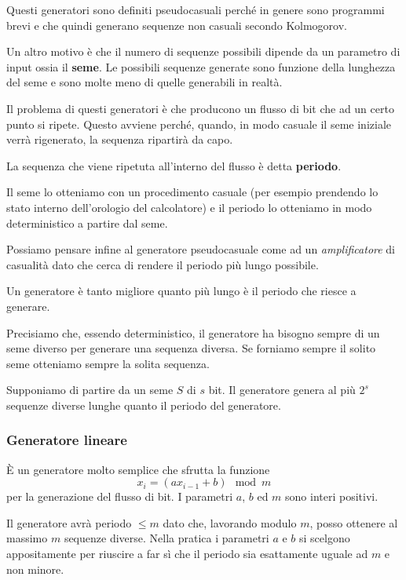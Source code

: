 Questi generatori sono definiti pseudocasuali perch\'e in genere sono programmi brevi e che quindi generano sequenze
non casuali secondo Kolmogorov.

Un altro motivo \`e che il numero di sequenze possibili dipende da un parametro di input ossia il \textbf{seme}. Le
possibili sequenze generate sono funzione della lunghezza del seme e sono molte meno di quelle generabili in realt\`a.

Il problema di questi generatori \`e che producono un flusso di bit che ad un certo punto si ripete. Questo avviene
perch\'e, quando, in modo casuale il seme iniziale verr\`a rigenerato, la sequenza ripartir\`a da capo.

La sequenza che viene ripetuta all'interno del flusso \`e detta \textbf{periodo}.

Il seme lo otteniamo con un procedimento casuale (per esempio prendendo lo stato interno dell'orologio del calcolatore)
e il periodo lo otteniamo in modo deterministico a partire dal seme.

Possiamo pensare infine al generatore pseudocasuale come ad un \emph{amplificatore} di casualit\`a dato che cerca di
rendere il periodo pi\`u lungo possibile.

Un generatore \`e tanto migliore quanto pi\`u lungo \`e il periodo che riesce a generare.

Precisiamo che, essendo deterministico, il generatore ha bisogno sempre di un seme diverso per generare una sequenza
diversa. Se forniamo sempre il solito seme otteniamo sempre la solita sequenza.

Supponiamo di partire da un seme $S$ di $s$ bit. Il generatore genera al pi\`u $2^s$ sequenze diverse lunghe quanto il
periodo del generatore.

\subsubsection{Generatore lineare}
\`E un generatore molto semplice che sfrutta la funzione
\[ x_i = (a x_{i - 1} + b) \mod{m} \]
per la generazione del flusso di bit. I parametri $a$, $b$ ed $m$ sono interi positivi.

Il generatore avr\`a periodo $\leq m$ dato che, lavorando modulo $m$, posso ottenere al massimo $m$ sequenze diverse.
Nella pratica i parametri $a$ e $b$ si scelgono appositamente per riuscire a far s\`i che il periodo sia esattamente
uguale ad $m$ e non minore.

